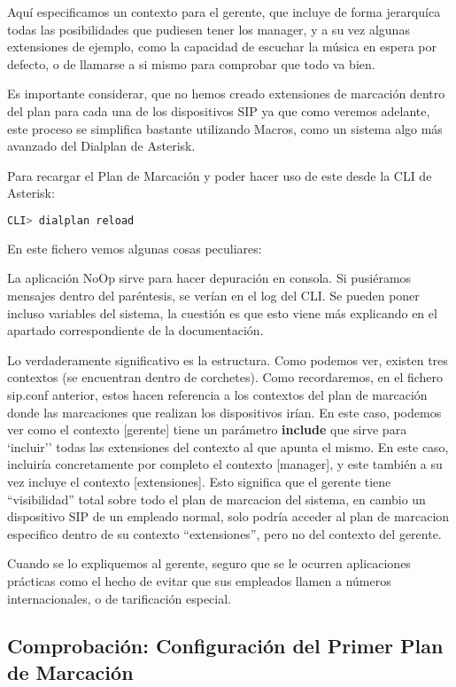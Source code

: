 Aquí especificamos un contexto para el gerente, que incluye de forma jerarquíca todas las posibilidades que pudiesen tener los manager, y a su vez algunas extensiones de ejemplo, como la capacidad de escuchar la música en espera por defecto, o de llamarse a si mismo para comprobar que todo va bien.

Es importante considerar, que no hemos creado extensiones de marcación dentro del plan para cada una de los dispositivos SIP ya que como veremos adelante, este proceso se simplifica bastante utilizando Macros, como un sistema algo más avanzado del Dialplan de Asterisk.

Para recargar el Plan de Marcación y poder hacer uso de este desde la CLI de Asterisk:

\begin{lstlisting}[language=sh]
CLI> dialplan reload
\end{lstlisting}

 En este fichero vemos algunas cosas peculiares:

La aplicación NoOp sirve para hacer depuración en consola. Si pusiéramos mensajes dentro del paréntesis, se verían en el log del CLI. Se pueden poner incluso variables del sistema, la cuestión es que esto viene más explicando en el apartado correspondiente de la documentación.

Lo verdaderamente significativo es la estructura. Como podemos ver, existen tres contextos (se encuentran dentro de corchetes). Como recordaremos, en el fichero sip.conf anterior, estos hacen referencia a los contextos del plan de marcación donde las marcaciones que realizan los dispositivos irían. En este caso, podemos ver como el contexto [gerente] tiene un parámetro \textbf{include} que sirve para `incluir'' todas las extensiones del contexto al que apunta el mismo. En este caso, incluiría concretamente por completo el contexto [manager], y este también a su vez incluye el contexto [extensiones]. Esto significa que el gerente tiene ``visibilidad'' total sobre todo el plan de marcacion del sistema, en cambio un dispositivo SIP de un empleado normal, solo podría acceder al plan de marcacion especifico dentro de su contexto ``extensiones'', pero no del contexto del gerente.

Cuando se lo expliquemos al gerente, seguro que se le ocurren aplicaciones prácticas como el hecho de evitar que sus empleados llamen a números internacionales, o de tarificación especial.

\subsection{Comprobación: Configuración del Primer Plan de Marcación}

